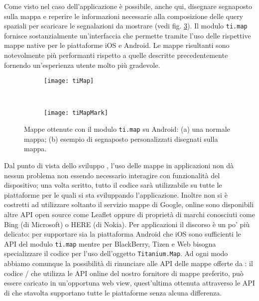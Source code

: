             Come visto nel caso dell'applicazione \pg{} è possibile, anche qui,
            disegnare segnaposto sulla mappa e reperire le informazioni
            necessarie alla composizione delle query spaziali per scaricare le
            segnalazioni da mostrare (vedi fig. \ref{fig:TiMaps}). Il modulo
            \texttt{ti.map} fornisce sostanzialmente un'interfaccia che permette
            tramite \js{} l'uso delle rispettive mappe native per le piattaforme
            iOS e Android. Le mappe risultanti sono notevolmente più performanti
            rispetto a quelle descritte precedentemente fornendo un'esperienza
            utente molto più gradevole.
            \begin{figure}[H]
                \centering
                \begin{subfigure}[b]{0.485\textwidth}
                    \texttt{[image: tiMap]}
                    \caption{}
                    \label{fig:tiMap}
                \end{subfigure}
                ~
                \begin{subfigure}[b]{0.485\textwidth}
                    \texttt{[image: tiMapMark]}
                    \caption{}
                    \label{fig:tiMapMark}
                \end{subfigure}
                \caption{
                    Mappe ottenute con il modulo \texttt{ti.map} su Android: (a)
                    una normale mappa; (b) esempio di segnaposto personalizzati
                    disegnati sulla mappa.
                }
                \label{fig:TiMaps}
            \end{figure}
            Dal punto di vista dello sviluppo \crossplat{}, l'uso delle mappe in
            applicazioni \pg{} non dà nessun problema non essendo necessario
            interagire con funzionalità del dispositivo; una volta scritto,
            tutto il codice sarà utilizzabile su tutte le piattaforme per le
            quali si sta sviluppando l'applicazione. Inoltre non si è
            costretti ad utilizzare soltanto il servizio mappe di Google, online
            sono disponibili altre API \js{} open source come Leaflet oppure
            di proprietà di marchi conosciuti come Bing (di Microsoft) o HERE
            (di Nokia). Per applicazioni \tisdk{} il discorso è un po' più
            delicato: per supportare sia la piattaforma Android che iOS sono
            sufficienti le API del modulo \texttt{ti.map} mentre per BlackBerry,
            Tizen e Web bisogna specializzare il codice per l'uso dell'oggetto
            \texttt{Titanium.Map}. Ad ogni modo abbiamo comunque la possibilità
            di rinunciare alle API delle mappe offerte da \tisdk{}: il codice
            \js{}/\html{} che utilizza le API online del nostro fornitore di
            mappe preferito, può essere caricato in un'opportuna web view,
            quest'ultima ottenuta attraverso le API di \tisdk{} che stavolta
            supportano tutte le piattaforme senza alcuna differenza.
            

